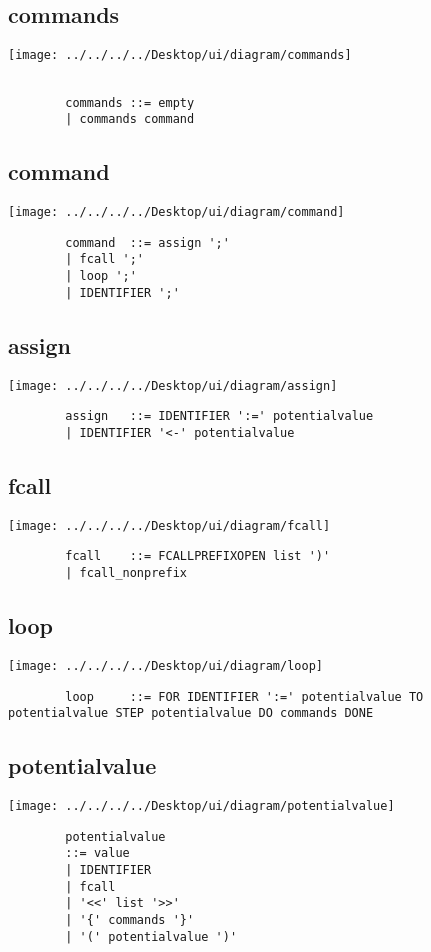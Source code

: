 \documentclass[11pt]{scrartcl}
\begin{document}
\begin{flushleft}
		\subsection*{commands}
		\texttt{[image: ../../../../Desktop/ui/diagram/commands]}
		
		\begin{verbatim}
		
		commands ::= empty
		| commands command
		\end{verbatim}
			\subsection*{command}
		\texttt{[image: ../../../../Desktop/ui/diagram/command]}
		\begin{verbatim}
		command  ::= assign ';'
		| fcall ';'
		| loop ';'
		| IDENTIFIER ';'
		\end{verbatim}
			\subsection*{assign}
		\texttt{[image: ../../../../Desktop/ui/diagram/assign]}
		\begin{verbatim}
		assign   ::= IDENTIFIER ':=' potentialvalue
		| IDENTIFIER '<-' potentialvalue
		\end{verbatim}
			\subsection*{fcall}
		\texttt{[image: ../../../../Desktop/ui/diagram/fcall]}\begin{verbatim}
		fcall    ::= FCALLPREFIXOPEN list ')'
		| fcall_nonprefix
		\end{verbatim}
			\subsection*{loop}
		\texttt{[image: ../../../../Desktop/ui/diagram/loop]}
		\begin{verbatim}
		loop     ::= FOR IDENTIFIER ':=' potentialvalue TO potentialvalue STEP potentialvalue DO commands DONE
		\end{verbatim}
			\subsection*{potentialvalue}
		\texttt{[image: ../../../../Desktop/ui/diagram/potentialvalue]}
		\begin{verbatim}
		potentialvalue
		::= value
		| IDENTIFIER
		| fcall
		| '<<' list '>>'
		| '{' commands '}'
		| '(' potentialvalue ')'
		\end{verbatim}

\end{flushleft}
\end{document}
